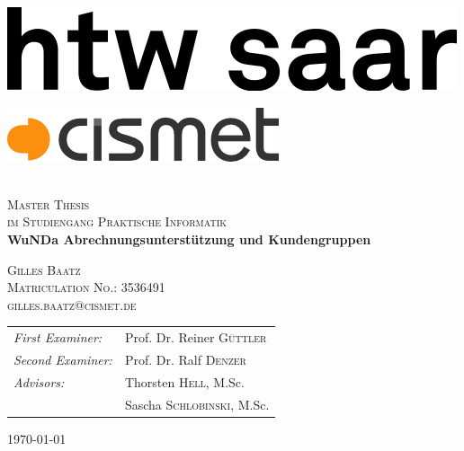 \begin{titlepage}
\begin{center}

\begin{minipage}[t]{0.4\textwidth}
	\begin{flushleft}
	\includegraphics[width=\textwidth]{preamble/img/logo_htw_saar}
	\end{flushleft}
\end{minipage}
\hfill
\begin{minipage}[t]{0.4\textwidth}
	\begin{flushright}
	\includegraphics[width=\textwidth]{preamble/img/logo_cismet_grey}
	\end{flushright}
\end{minipage}



~\\[1cm]

\textsc{\LARGE Master Thesis}\\
\textsc{\large im Studiengang Praktische Informatik}\\[1.5cm]
\hspace{0.4cm}
{ \huge \bfseries  WuNDa Abrechnungsunterstützung und Kundengruppen \\[0.4cm] }

\hspace{1.5cm}

\textsc{\large Gilles Baatz}\\[0.2cm]
\textsc{\large Matriculation No.: 3536491}\\[0.2cm]
\textsc{\large gilles.baatz@cismet.de}\\[4cm]

\begin{tabular}[0.8\textwidth]{l l}
\emph{First Examiner:} & Prof. Dr. Reiner \textsc{Güttler} \\
\emph{Second Examiner:} & Prof. Dr. Ralf \textsc{Denzer} \\
\emph{Advisors:} & Thorsten \textsc{Hell}, M.Sc. \\
 				& Sascha \textsc{Schlobinski}, M.Sc.
\end{tabular}


\vfill

{\large \today}

\end{center}
\end{titlepage}